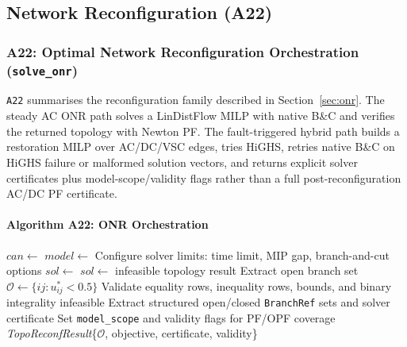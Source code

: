 \subsection{Network Reconfiguration (A22)}
\label{sec:algo-onr}

\subsubsection{A22: Optimal Network Reconfiguration Orchestration (\texttt{solve\_onr})}
\label{algo:a22}

\texttt{A22} summarises the reconfiguration family described in
Section~\ref{sec:onr}.  The steady AC ONR path solves a LinDistFlow MILP with
native B\&C and verifies the returned topology with Newton PF.  The
fault-triggered hybrid path builds a restoration MILP over AC/DC/VSC edges,
tries HiGHS, retries native B\&C on HiGHS failure or malformed solution vectors,
and returns explicit solver certificates plus model-scope/validity flags rather
than a full post-reconfiguration AC/DC PF certificate.

\paragraph{Algorithm A22: ONR Orchestration}
\begin{algorithmic}[1]
  \State $\mathit{can} \gets$  
  \State $\mathit{model} \gets$  
  \State Configure solver limits: time limit, MIP gap, branch-and-cut options
  \State $\mathit{sol} \gets$ 
    \State $\mathit{sol} \gets$ 
  \EndIf
    \State \Return infeasible topology result
  \EndIf
  \State Extract open branch set $\mathcal{O} \gets \{ij : u_{ij}^* < 0.5\}$
  \State Validate equality rows, inequality rows, bounds, and binary integrality
   \Return infeasible \EndIf
  \State Extract structured open/closed \texttt{BranchRef} sets and solver certificate
  \State Set \texttt{model\_scope} and validity flags for PF/OPF coverage
  \State \Return \textit{TopoReconfResult}\{$\mathcal{O}$, objective, certificate, validity\}
\EndProcedure
\end{algorithmic}

